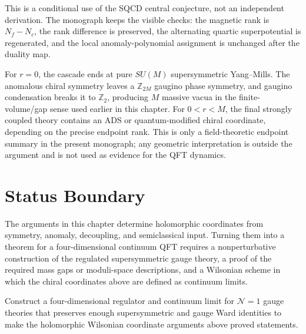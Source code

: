 This is a conditional use of the SQCD central conjecture, not an independent
derivation.  The monograph keeps the visible checks: the magnetic rank is
\(N_f-N_c\), the rank difference is preserved, the alternating quartic
superpotential is regenerated, and the local anomaly-polynomial assignment is
unchanged after the duality map.

For \(r=0\), the cascade ends at pure \(SU(M)\) supersymmetric Yang--Mills.
The anomalous chiral symmetry leaves a \(\mathbb Z_{2M}\) gaugino phase
symmetry, and gaugino condensation breaks it to \(\mathbb Z_2\), producing
\(M\) massive vacua in the finite-volume/gap sense used earlier in this
chapter.  For \(0<r<M\), the final strongly coupled theory contains an ADS
or quantum-modified chiral coordinate, depending on the precise endpoint
rank.  This is only a field-theoretic endpoint summary in the present
monograph; any geometric interpretation is outside the argument and is not
used as evidence for the QFT dynamics.

\section{Status Boundary}

The arguments in this chapter determine holomorphic coordinates from symmetry,
anomaly, decoupling, and semiclassical input.  Turning them into a theorem for
a four-dimensional continuum QFT requires a nonperturbative construction of
the regulated supersymmetric gauge theory, a proof of the required mass gaps
or moduli-space descriptions, and a Wilsonian scheme in which the chiral
coordinates above are defined as continuum limits.

\begin{openproblem}[Nonperturbative \(\mathcal N=1\) Wilsonian scheme]
\label{op:n1-nonperturbative-wilsonian-scheme}
Construct a four-dimensional regulator and continuum limit for
\(\mathcal N=1\) gauge theories that preserves enough supersymmetric and gauge
Ward identities to make the holomorphic Wilsonian coordinate arguments above
proved statements.
\end{openproblem}
